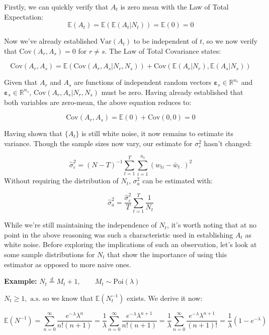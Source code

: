 Firstly, we can quickly verify that $A_t$ is zero mean with the Law of Total Expectation:
$$ \mathbb{E}(A_t) = \mathbb{E}(\mathbb{E}(A_t|N_t)) = \mathbb{E}(0) = 0 $$

Now we've already established $\text{Var}(A_t)$ to be independent of $t$, so we now verify that $\text{Cov}(A_r,A_s) = 0$ for $r \neq s$. The Law of Total Covariance states:


$$ \text{Cov}(A_r,A_s) = \mathbb{E}(\text{Cov}(A_r,A_s|N_r,N_s)) + \text{Cov}(\mathbb{E}(A_r|N_r), \mathbb{E}(A_s|N_s))$$

Given that $A_r$ and $A_s$ are functions of independent random vectors $\bm{\varepsilon}_r \in \mathbb{R}^{n_r}$ and $\bm{\varepsilon}_s \in \mathbb{R}^{n_s}$, $\text{Cov}(A_r,A_s|N_r,N_s)$ must be zero. Having already established that both variables are zero-mean, the above equation reduces to:

$$ \text{Cov}(A_r,A_s) = \mathbb{E}(0) + \text{Cov}(0, 0) = 0$$

Having shown that $\{A_t\}$ is still white noise, it now remains to estimate its variance. Though the sample sizes now vary, our estimate for $\sigma_\varepsilon^2$ hasn't changed:

\begin{equation}
    \hat{\sigma}_\varepsilon^2 =(N-T)^{-1}\sum_{t=1}^T\sum_{i=1}^{n_t}(w_{ti}-\bar{w}_{t\cdot})^2 
    \label{eq:var_eps_hat}
\end{equation}
Without requiring the distribution of $N_t$, $\sigma_a^2$ can be estimated with:

\begin{equation}
    \label{eq:var_a_n}
    \hat{\sigma}_a^2 = \frac{\hat{\sigma}_\varepsilon^2}{T}\sum_{t=1}^T\frac{1}{N_t}
\end{equation}


While we're still maintaining the independence of $N_t$, it's worth noting that at no point in the above reasoning was such a characteristic used in establishing $A_t$ as white noise. Before exploring the implications of such an observation, let's look at some sample distributions for $N_t$ that show the importance of using this estimator as opposed to more naive ones.


\textbf{Example:} $N_t \overset{d}{=} M_t + 1, \qquad M_t \sim \text{Poi}(\lambda)$ 

$N_t \geq 1, \text{ a.s.}$ so we know that $\mathbb{E}(N_t^{-1})$ exists. We derive it now:

$$   \mathbb{E}(N^{-1}) = \sum_{n=0}^\infty \frac{e^{-\lambda}\lambda^n}{n!(n+1)} =  \frac{1}{\lambda}\sum_{n=0}^\infty \frac{e^{-\lambda}\lambda^{n+1}}{n!(n+1)} = \frac{1}{\lambda}\sum_{n=0}^\infty \frac{e^{-\lambda}\lambda^{n+1}}{(n+1)!} = \frac{1}{\lambda}(1-e^{-\lambda})  $$

